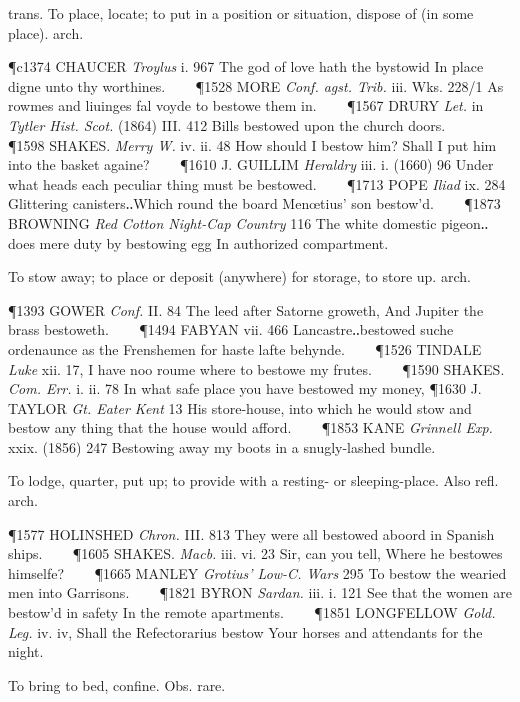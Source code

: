 \begin{description}[wide, labelwidth=!, labelindent=0pt]
\begin{myenumerate}
 trans. To place, locate; to put in a position or situation, dispose of (in some place). arch.

\P c1374 CHAUCER  \textit{Troylus} i. 967 The god of love hath the bystowid In place digne unto thy worthines.    
\P 1528 MORE  \textit{Conf. agst. Trib.} iii. Wks. 228/1 As rowmes and liuinges fal voyde to bestowe them in.    
\P 1567 DRURY  \textit{Let.} in \textit{Tytler Hist. Scot.} (1864) III. 412 Bills bestowed upon the church doors.    
\P 1598 SHAKES.  \textit{Merry W.} iv. ii. 48 How should I bestow him? Shall I put him into the basket againe?    
\P 1610 J. GUILLIM  \textit{Heraldry} iii. i. (1660) 96 Under what heads each peculiar thing must be bestowed.    
\P 1713 POPE  \textit{Iliad} ix. 284 Glittering canisters‥Which round the board Menœtius' son bestow'd.    
\P 1873 BROWNING  \textit{Red Cotton Night-Cap Country} 116 The white domestic pigeon‥does mere duty by bestowing egg In authorized compartment.

 To stow away; to place or deposit (anywhere) for storage, to store up. arch.

\P 1393 GOWER  \textit{Conf.} II. 84 The leed after Satorne groweth, And Jupiter the brass bestoweth.    
\P 1494 FABYAN vii. 466 Lancastre‥bestowed suche ordenaunce as the Frenshemen for haste lafte behynde.    
\P 1526 TINDALE  \textit{Luke} xii. 17, I have noo roume where to bestowe my frutes.    
\P 1590 SHAKES.  \textit{Com. Err.} i. ii. 78 In what safe place you have bestowed my money,
\P 1630 J. TAYLOR  \textit{Gt. Eater Kent} 13 His store-house, into which he would stow and bestow any thing that the house would afford.    
\P 1853 KANE  \textit{Grinnell Exp.} xxix. (1856) 247 Bestowing away my boots in a snugly-lashed bundle.

 To lodge, quarter, put up; to provide with a resting- or sleeping-place. Also refl. arch.

\P 1577 HOLINSHED  \textit{Chron.} III. 813 They were all bestowed aboord in Spanish ships.    
\P 1605 SHAKES.  \textit{Macb.} iii. vi. 23 Sir, can you tell, Where he bestowes himselfe?    
\P 1665 MANLEY  \textit{Grotius' Low-C. Wars} 295 To bestow the wearied men into Garrisons.    
\P 1821 BYRON  \textit{Sardan.} iii. i. 121 See that the women are bestow'd in safety In the remote apartments.    
\P 1851 LONGFELLOW  \textit{Gold. Leg.} iv. iv, Shall the Refectorarius bestow Your horses and attendants for the night.

 To bring to bed, confine. Obs. rare.


\end{myenumerate}
\end{description}
